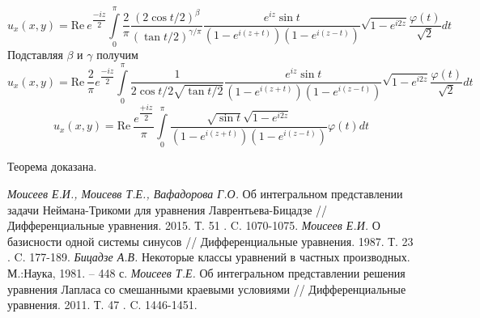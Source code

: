 \documentclass[12pt, a4paper]{article}
\begin{document}
	\begin{equation*}
		u_x(x,y) = \mathrm{Re} \ e^{\dfrac{-iz}{2}} \int\limits_0^\pi \dfrac{2}{\pi}\dfrac{(2\cos{t/2})^\beta}{(\tan{t/2})^{\gamma/\pi}}  \dfrac{e^{iz} \sin{t}}{\left(1 - e^{i(z+t)} \right) \left(1 - e^{i(z-t)}\right)} \sqrt{1 - e^{i2z}} \dfrac{\varphi(t)}{\sqrt2} dt
	\end{equation*}
	Подставляя $\beta$ и $\gamma$ получим
	\begin{equation*}
		u_x(x,y) = \mathrm{Re} \  \dfrac{2}{\pi} e^{\dfrac{-iz}{2}} \int\limits_0^\pi \dfrac{1}{2\cos{t/2} \sqrt{\tan{t/2}}}  \dfrac{e^{iz} \sin{t}}{\left(1 - e^{i(z+t)} \right) \left(1 - e^{i(z-t)}\right)} \sqrt{1 - e^{i2z}} \dfrac{\varphi(t)}{\sqrt2} dt
	\end{equation*}
	\begin{equation*}
		u_x(x,y) = \mathrm{Re} \  \dfrac{e^{\dfrac{+iz}{2}}}{\pi}  \int\limits_0^\pi  \dfrac{\sqrt{\sin{t}} \sqrt{1 - e^{i2z}}}{\left(1 - e^{i(z+t)} \right) \left(1 - e^{i(z-t)}\right)}  \varphi(t) dt
	\end{equation*}
	
	Теорема доказана.


\newpage
\begin{thebibliography}{30}

{\it Моисеев Е.И., Моисевв Т.Е., Вафадорова Г.О.} Об интегральном представлении задачи Неймана-Трикоми для уравнения Лаврентьева-Бицадзе // Дифференциальные уравнения. 2015. Т. 51 . C. 1070-1075.
{\it Моисеев Е.И.} О базисности одной системы синусов // Дифференциальные уравнения. 1987. Т. 23 . C. 177-189.
{\it Бицадзе А.В.} Некоторые классы уравнений в частных производных. М.:Наука, 1981. -- 448 с.
{\it Моисеев Т.Е.} Об интегральном представлении решения уравнения Лапласа со смешанными краевыми условиями // Дифференциальные уравнения. 2011. Т. 47 . C. 1446-1451.


\end{thebibliography}
\end{document}
